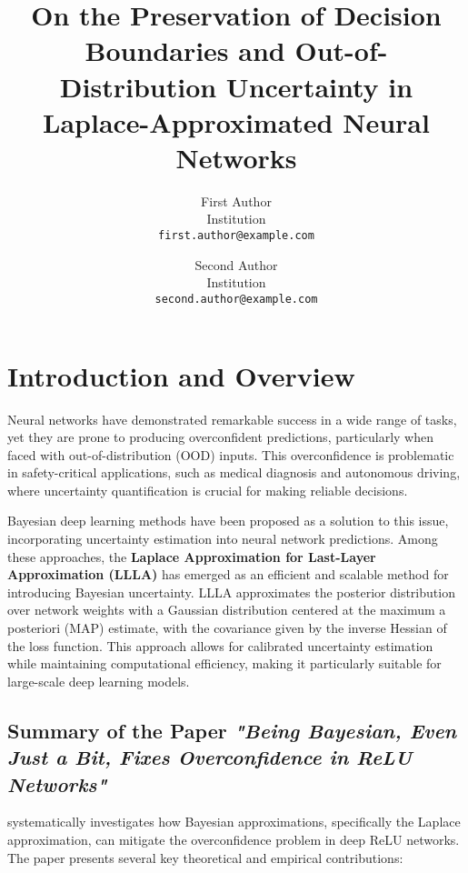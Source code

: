 \documentclass{article}
\title{On the Preservation of Decision Boundaries and Out-of-Distribution Uncertainty in Laplace-Approximated Neural Networks}
\author{%
  First Author \\
  Institution \\
  \texttt{first.author@example.com}
  \and
  Second Author \\
  Institution \\
  \texttt{second.author@example.com}
}
\begin{document}
\maketitle

\section{Introduction and Overview}

Neural networks have demonstrated remarkable success in a wide range of tasks, yet they are prone to producing overconfident predictions, particularly when faced with out-of-distribution (OOD) inputs. This overconfidence is problematic in safety-critical applications, such as medical diagnosis and autonomous driving, where uncertainty quantification is crucial for making reliable decisions.

Bayesian deep learning methods have been proposed as a solution to this issue, incorporating uncertainty estimation into neural network predictions. Among these approaches, the \textbf{Laplace Approximation for Last-Layer Approximation (LLLA)} \cite{main_paper} has emerged as an efficient and scalable method for introducing Bayesian uncertainty. LLLA approximates the posterior distribution over network weights with a Gaussian distribution centered at the maximum a posteriori (MAP) estimate, with the covariance given by the inverse Hessian of the loss function. This approach allows for calibrated uncertainty estimation while maintaining computational efficiency, making it particularly suitable for large-scale deep learning models.

\subsection{Summary of the Paper \emph{"Being Bayesian, Even Just a Bit, Fixes Overconfidence in ReLU Networks"}}

\cite{main_paper} systematically investigates how Bayesian approximations, specifically the Laplace approximation, can mitigate the overconfidence problem in deep ReLU networks. The paper presents several key theoretical and empirical contributions:
\end{document}
